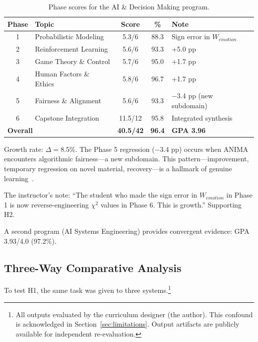 \documentclass[11pt,a4paper]{article}
\begin{document}
\begin{table}[h]
\centering
\begin{tabular}{@{}clccl@{}}
\toprule
Phase & Topic & Score & \% & Note \\
\midrule
1 & Probabilistic Modeling & 5.3/6 & 88.3 & Sign error in $W_{emotion}$ \\
2 & Reinforcement Learning & 5.6/6 & 93.3 & +5.0 pp \\
3 & Game Theory \& Control & 5.7/6 & 95.0 & +1.7 pp \\
4 & Human Factors \& Ethics & 5.8/6 & 96.7 & +1.7 pp \\
5 & Fairness \& Alignment & 5.6/6 & 93.3 & $-$3.4 pp (new subdomain) \\
6 & Capstone Integration & 11.5/12 & 95.8 & Integrated synthesis \\
\midrule
\multicolumn{2}{l}{\textbf{Overall}} & \textbf{40.5/42} & \textbf{96.4} & \textbf{GPA 3.96} \\
\bottomrule
\end{tabular}
\caption{Phase scores for the AI \& Decision Making program.}
\label{tab:phases}
\end{table}

Growth rate: $\Delta = 8.5\%$. The Phase 5 regression ($-3.4$ pp) occurs when ANIMA encounters algorithmic fairness---a new subdomain. This pattern---improvement, temporary regression on novel material, recovery---is a hallmark of genuine learning~\citep{ericsson1993role,vygotsky1978mind}.

The instructor's note: ``The student who made the sign error in $W_{emotion}$ in Phase 1 is now reverse-engineering $\chi^2$ values in Phase 6. This is growth.'' Supporting H2.

A second program (AI Systems Engineering) provides convergent evidence: GPA 3.93/4.0 (97.2\%).

\subsection{Three-Way Comparative Analysis}

To test H1, the same task was given to three systems.\footnote{All outputs evaluated by the curriculum designer (the author). This confound is acknowledged in Section~\ref{sec:limitations}. Output artifacts are publicly available for independent re-evaluation.}
\end{document}
